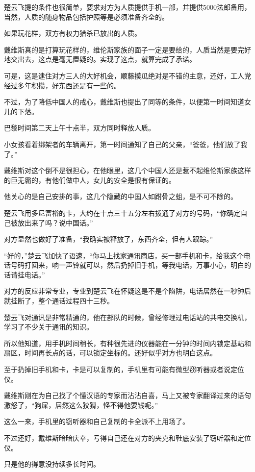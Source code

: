楚云飞提的条件也很简单，要求对方为人质提供手机一部，并提供5000法郎备用，当然，人质的随身物品包括护照等是必须准备齐全的。

如果玩花样，双方有权力猎杀已放出的人质。

戴维斯真的是打算玩花样的，维伦斯家族的面子一定是要给的，人质当然是要完好地交出去，这点是毫无置疑的。实现了这点，就算完成了承诺。

可是，这是逮住对方三人的大好机会，顺藤摸瓜绝对是不错的主意，还好，工人党经过多年积攒，好东西还是有一些的。

不过，为了降低中国人的戒心，戴维斯也提出了同等的条件，以便第一时间知道女儿的下落。

巴黎时间第二天上午十点半，双方同时释放人质。

小女孩看着绑架者的车辆离开，第一时间通知了自己的父亲，“爸爸，他们放了我了。”

戴维斯对这个倒不是很担心，在他眼里，这几个中国人还是惹不起维伦斯家族这样的巨无霸的，有他们做中人，女儿的安全是很有保证的。

他关心的是自己安排的事，这几个隐藏的中国人如跗骨之蛆，是不可不除的。

楚云飞用多尼富裕的卡，大约在十点三十五分左右拨通了对方的号码，“你确定自己被放出来了吗？说中国话。”

对方显然也做好了准备，“我确实被释放了，东西齐全，但有人跟踪。”

“好的，”楚云飞加快了语速，“你马上找家通讯商店，买一部手机和卡，给我这个电话号码打回来，响一声铃就可以，然后扔掉旧手机，等我电话，万事小心，明白的话请挂电话。”

对方的反应非常专业，专业到楚云飞在怀疑这是不是个陷阱，电话居然在一秒钟后就挂断了，整个通话过程四十三秒。

楚云飞对通讯是非常精通的，他在部队的时候，曾经修理过电话站的共电交换机，学习了不少关于通讯的知识。

所以他知道，用手机时间稍长，有种很先进的仪器能在一分钟的时间内锁定基站和扇区，时间再长点的话，可以锁定坐标的。还好似乎对方也明白这点。

至于扔掉旧手机和卡，卡是可以复制的，手机里有可能有微型窃听器或者说定位仪。

戴维斯刚在为自己找了个懂汉语的专家而沾沾自喜，马上又被专家翻译过来的语句激怒了，“狗屎，居然这么狡猾，怪不得他要钱呢。”

这么一来，手机里的窃听器和自己复制的卡全派不上用场了。

不过还好，戴维斯暗暗庆幸，亏得自己还在对方的夹克和鞋底安装了窃听器和定位仪。

只是他的得意没持续多长时间。

